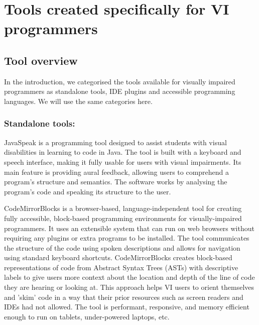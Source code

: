 \documentclass{l4proj}
\begin{document}
\section{Tools created specifically for VI programmers}
\label{section: VI_tools}

\subsection{Tool overview}

In the introduction, we categorised the tools available for visually impaired programmers as standalone tools, IDE plugins and accessible programming languages. We will use the same categories here.

\subsubsection{Standalone tools:}

JavaSpeak \cite{Javaspeak_2000} is a programming tool designed to assist students with visual disabilities in learning to code in Java. The tool is built with a keyboard and speech interface, making it fully usable for users with visual impairments. Its main feature is providing aural feedback, allowing users to comprehend a program's structure and semantics. The software works by analysing the program's code and speaking its structure to the user. 

CodeMirrorBlocks \cite{code_mirror_block_2019} is a browser-based, language-independent tool for creating fully accessible, block-based programming environments for visually-impaired programmers. It uses an extensible system that can run on web browsers without requiring any plugins or extra programs to be installed. The tool communicates the structure of the code using spoken descriptions and allows for navigation using standard keyboard shortcuts. CodeMirrorBlocks creates block-based representations of code from Abstract Syntax Trees (ASTs) with descriptive labels to give users more context about the location and depth of the line of code they are hearing or looking at. This approach helps VI users to orient themselves and 'skim' code in a way that their prior resources such as screen readers and IDEs had not allowed. The tool is performant, responsive, and memory efficient enough to run on tablets, under-powered laptops, etc.
\end{document}
